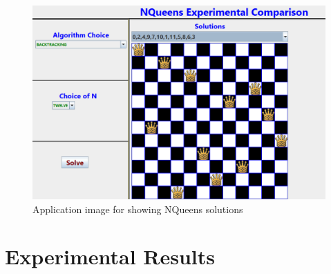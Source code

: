 \documentclass[conference]{IEEEtran}
\begin{document}
\begin{figure}
\includegraphics[scale=0.3]{BacktrackingNqueensSoln.png}
\caption{Application image for showing NQueens solutions}
\label{Figure9}
\end{figure}

\section{Experimental Results}
\end{document}
